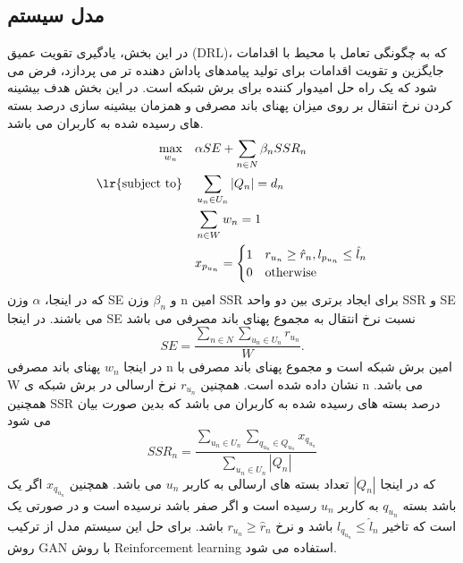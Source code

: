 \subsection{مدل سیستم}
در این بخش، یادگیری تقویت عمیق (DRL)، که به چگونگی تعامل با محیط با اقدامات جایگزین و تقویت اقدامات برای تولید پیامدهای پاداش دهنده تر می پردازد، فرض می شود که یک راه حل امیدوار کننده برای برش شبکه است\cite{drl}.
در این بخش هدف بیشینه کردن نرخ انتقال بر روی میزان پهنای باند مصرفی و همزمان بیشینه سازی درصد بسته های رسیده شده به کاربران می باشد.
 \begin{equation}
\begin{aligned}
\max\limits_{w_n}   \quad &  \alpha SE + \sum_{n\in N} \beta_n SSR_n  \\
\text{\lr{subject to}} \quad  & \sum_{u_n\in U_n} |Q_n| = d_n    \\
& \sum_{n\in W} w_n =1   \\
& x_{p_{u_n}} = 
\begin{cases}
      1 & r_{u_n} \geq \hat{r}_n, l_{p_{u_n}} \leq \hat{l}_n\\
      0 & \text{otherwise}
    \end{cases}  
\end{aligned}	
\end{equation} 
 که در اینجا، $\alpha$ وزن SE و $\beta_n$ وزن n امین SSR برای ایجاد برتری بین دو واحد SSR و SE می باشند.
 در اینجا SE
 نسبت نرخ انتقال به مجموع پهنای باند مصرفی می باشد
 \begin{equation}
 SE = \frac{\sum_{n\in N}\sum_{u_n\in U_n} r_{u_n}}{W}.
 \end{equation}
 در اینجا $w_n$ پهنای باند مصرفی n امین برش شبکه است و مجموع پهنای باند مصرفی با W نشان داده شده است.
 همچنین $r_{u_n}$ نرخ ارسالی در برش شبکه ی n می باشد.
 همچنین SSR درصد بسته های رسیده شده به کاربران می باشد که بدین صورت بیان می شود
 \begin{equation}
 SSR_n = \frac{\sum_{u_n\in U_n}\sum_{q_{u_n}\in Q_{u_n}}x_{q_{u_n}}}{\sum_{u_n\in U_n}|Q_n|}
 \end{equation}
 که در اینجا $|Q_n|$
 تعداد بسته های ارسالی به کاربر $u_n$ می باشد.
 همچنین $x_{q_{u_n}}$  اگر یک باشد بسته $q_{u_n}$ به کاربر $u_n$ رسیده است و اگر صفر باشد نرسیده است و در صورتی یک است که تاخیر $l_{q_{u_n}} \leq \hat{l}_n $
 باشد و نرخ 
 $r_{u_n} \geq \hat{r}_n $
 باشد\cite{gan1, gan2}.
 برای حل این سیستم مدل از ترکیب روش GAN
 با روش 
 Reinforcement learning
  استفاده می شود.
